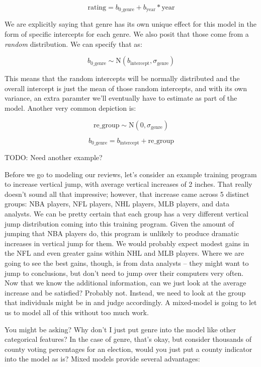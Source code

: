 \documentclass[
  letterpaper,
]{krantz}
\begin{document}
\[
\textrm{rating} = b_{\textrm{0\_genre}} + b_\textrm{year}*\textrm{year}
\]

We are explicitly saying that genre has its own unique effect for this
model in the form of specific intercepts for each genre. We also posit
that those come from a \emph{random} distribution. We can specify that
as:

\[b_{\textrm{0\_genre}} \sim \textrm{N}(b_\textrm{intercept}, \sigma_\textrm{genre})\]

This means that the random intercepts will be normally distributed and
the overall intercept is just the mean of those random intercepts, and
with its own variance, an extra paramter we'll eventually have to
estimate as part of the model. Another very common depiction is:

\[\textrm{re\_group} \sim \textrm{N}(0, \sigma_\textrm{genre})\]

\[b_{\textrm{0\_genre}} = b_\textrm{intercept} +\textrm{re\_group}\]

TODO: Need another example?

Before we go to modeling our reviews, let's consider an example training
program to increase vertical jump, with average vertical increases of 2
inches. That really doesn't sound all that impressive; however, that
increase came across 5 distinct groups: NBA players, NFL players, NHL
players, MLB players, and data analysts. We can be pretty certain that
each group has a very different vertical jump distribution coming into
this training program. Given the amount of jumping that NBA players do,
this program is unlikely to produce dramatic increases in vertical jump
for them. We would probably expect modest gains in the NFL and even
greater gains within NHL and MLB players. Where we are going to see the
best gains, though, is from data analysts -- they might want to jump to
conclusions, but don't need to jump over their computers very often. Now
that we know the additional information, can we just look at the average
increase and be satisfied? Probably not. Instead, we need to look at the
group that individuals might be in and judge accordingly. A mixed-model
is going to let us to model all of this without too much work.

You might be asking? Why don't I just put genre into the model like
other categorical features? In the case of genre, that's okay, but
consider thousands of county voting percentages for an election, would
you just put a county indicator into the model as is? Mixed models
provide several advantages:
\end{document}
